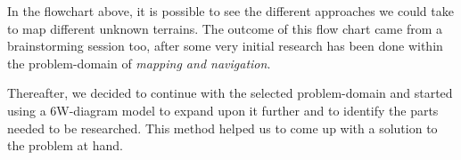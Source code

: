 In the flowchart above, it is possible to see the different approaches we could take to map different unknown terrains. The outcome of this flow chart came from a brainstorming session too, after some very initial research has been done within the problem-domain of \textit{mapping and navigation}.

Thereafter, we decided to continue with the selected problem-domain and started using a 6W-diagram model to expand upon it further and to identify the parts needed to be researched. This method helped us to come up with a solution to the problem at hand.
